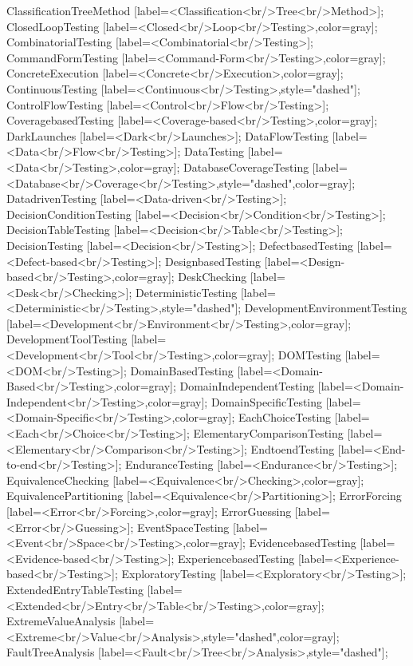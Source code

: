 \documentclass{article}
\begin{document}
{ClassificationTreeMethod [label=<Classification<br/>Tree<br/>Method>];
ClosedLoopTesting [label=<Closed<br/>Loop<br/>Testing>,color=gray];
CombinatorialTesting [label=<Combinatorial<br/>Testing>];
CommandFormTesting [label=<Command-Form<br/>Testing>,color=gray];
ConcreteExecution [label=<Concrete<br/>Execution>,color=gray];
ContinuousTesting [label=<Continuous<br/>Testing>,style="dashed"];
ControlFlowTesting [label=<Control<br/>Flow<br/>Testing>];
CoveragebasedTesting [label=<Coverage-based<br/>Testing>,color=gray];
DarkLaunches [label=<Dark<br/>Launches>];
DataFlowTesting [label=<Data<br/>Flow<br/>Testing>];
DataTesting [label=<Data<br/>Testing>,color=gray];
DatabaseCoverageTesting [label=<Database<br/>Coverage<br/>Testing>,style="dashed",color=gray];
DatadrivenTesting [label=<Data-driven<br/>Testing>];
DecisionConditionTesting [label=<Decision<br/>Condition<br/>Testing>];
DecisionTableTesting [label=<Decision<br/>Table<br/>Testing>];
DecisionTesting [label=<Decision<br/>Testing>];
DefectbasedTesting [label=<Defect-based<br/>Testing>];
DesignbasedTesting [label=<Design-based<br/>Testing>,color=gray];
DeskChecking [label=<Desk<br/>Checking>];
DeterministicTesting [label=<Deterministic<br/>Testing>,style="dashed"];
DevelopmentEnvironmentTesting [label=<Development<br/>Environment<br/>Testing>,color=gray];
DevelopmentToolTesting [label=<Development<br/>Tool<br/>Testing>,color=gray];
DOMTesting [label=<DOM<br/>Testing>];
DomainBasedTesting [label=<Domain-Based<br/>Testing>,color=gray];
DomainIndependentTesting [label=<Domain-Independent<br/>Testing>,color=gray];
DomainSpecificTesting [label=<Domain-Specific<br/>Testing>,color=gray];
EachChoiceTesting [label=<Each<br/>Choice<br/>Testing>];
ElementaryComparisonTesting [label=<Elementary<br/>Comparison<br/>Testing>];
EndtoendTesting [label=<End-to-end<br/>Testing>];
EnduranceTesting [label=<Endurance<br/>Testing>];
EquivalenceChecking [label=<Equivalence<br/>Checking>,color=gray];
EquivalencePartitioning [label=<Equivalence<br/>Partitioning>];
ErrorForcing [label=<Error<br/>Forcing>,color=gray];
ErrorGuessing [label=<Error<br/>Guessing>];
EventSpaceTesting [label=<Event<br/>Space<br/>Testing>,color=gray];
EvidencebasedTesting [label=<Evidence-based<br/>Testing>];
ExperiencebasedTesting [label=<Experience-based<br/>Testing>];
ExploratoryTesting [label=<Exploratory<br/>Testing>];
ExtendedEntryTableTesting [label=<Extended<br/>Entry<br/>Table<br/>Testing>,color=gray];
ExtremeValueAnalysis [label=<Extreme<br/>Value<br/>Analysis>,style="dashed",color=gray];
FaultTreeAnalysis [label=<Fault<br/>Tree<br/>Analysis>,style="dashed"];
}
\end{document}
